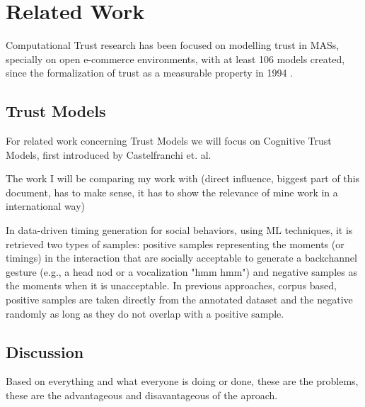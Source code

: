 

\section{Related Work}
\label{sec:Related Work}
Computational Trust research has been focused on modelling trust in \acp{MAS}, specially on open e-commerce environments\cite{Granatyr2015, HanYu2013, Pinyol2013, Noorian2010, Huang2008}, with at least 106 models created\cite{Granatyr2015}, since the formalization of trust as a measurable property in 1994 \cite{Marsh1994}.

\subsection{Trust Models}
\label{subsec:Related work:Trust Models}
For related work concerning Trust Models we will focus on Cognitive Trust Models, first introduced by Castelfranchi et. al.\cite{Castelfranchi1998}



The work I will be comparing my work with (direct influence, biggest part of this document, has to make sense, it has to show the relevance of mine work in a international way)


In data-driven timing generation for social behaviors, using \ac{ML} techniques, it is retrieved two types of samples: positive samples representing the moments (or timings) in the interaction that are socially acceptable to generate a backchannel gesture (e.g., a head nod or a vocalization "hmm hmm") and negative samples as the moments when it is unacceptable. In previous approaches, corpus based, positive samples are taken directly from the annotated dataset and the negative randomly as long as they do not overlap with a positive sample. 




\subsection{Discussion}
\label{subsec:RelWorkDiscussion}

Based on everything and what everyone is doing or done, these are the problems, these are the advantageous and disavantageous of the aproach.